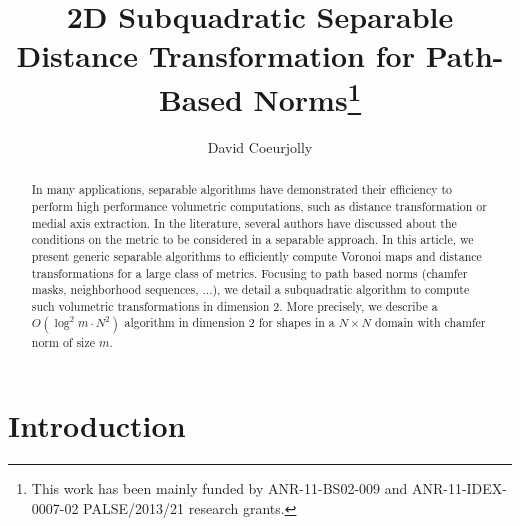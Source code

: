 \documentclass{llncs}
\title{2D Subquadratic Separable Distance Transformation for
  Path-Based Norms\thanks{This work has been mainly funded by
    ANR-11-BS02-009 and ANR-11-IDEX-0007-02 PALSE/2013/21 research
    grants.}}
\author{David Coeurjolly}
\institute{ CNRS,  LIRIS, UMR5205, F-69621, France\\
}
\begin{document}
\maketitle


\begin{abstract}\sloppy
In many applications, separable algorithms have demonstrated their
efficiency to perform high performance volumetric computations, such
as distance transformation or medial axis extraction. In the
literature, several authors have discussed about the conditions on the
metric to be considered in a separable approach.  In this article, we
present generic separable algorithms to efficiently compute Voronoi
maps and distance transformations for a large class of
metrics. Focusing to path based norms (chamfer masks, neighborhood
sequences, ...), we detail a subquadratic algorithm to compute such
volumetric transformations in dimension 2. More precisely, we describe
a $O(\log^2{m}\cdot N^2)$ algorithm in dimension 2 for shapes in a
$N\times N$ domain with chamfer norm of size $m$.

\end{abstract}

\section{Introduction}
\label{sec:introduction}
\end{document}
